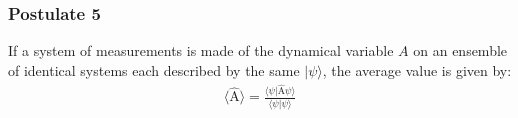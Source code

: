 \documentclass[11pt, letterpaper]{article}
\newcommand{\operator}[1]{
  \ensuremath{\hat{\text{#1}}}}        %
\newcommand{\ave}[1]{
  \ensuremath{\langle #1 \rangle}}     %
\newcommand{\ket}[1]{
  \ensuremath{| #1 \rangle }}          %
\newcommand{\braket}[2]{
  \ensuremath{\langle #1|#2 \rangle }} %
\begin{document}
\begin{multicols*}{3}
\subsubsection{Postulate 5}
If a system of measurements is made of the dynamical variable $A$ on an ensemble of identical systems each described by the same $\ket{\psi}$, the average value is given by:
\begin{align*}
  \ave{\operator{A}} = \frac{\braket{\psi}{\operator{A} \psi}}{\braket{\psi}{\psi}}
\end{align*}
\end{multicols*}
\end{document}
